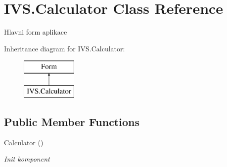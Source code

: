 \hypertarget{class_i_v_s_1_1_calculator}{}\section{I\+V\+S.\+Calculator Class Reference}
\label{class_i_v_s_1_1_calculator}


Hlavni form aplikace  


Inheritance diagram for I\+V\+S.\+Calculator\+:\begin{figure}[H]
\begin{center}
\leavevmode
\includegraphics[height=2.000000cm]{class_i_v_s_1_1_calculator}
\end{center}
\end{figure}
\subsection*{Public Member Functions}
\begin{DoxyCompactItemize}
\item 
\mbox{\hyperlink{class_i_v_s_1_1_calculator_a3d3f790c8ecb804fe212427b914dd82f}{Calculator}} ()
\begin{DoxyCompactList}\small\item\em Init komponent \end{DoxyCompactList}\end{DoxyCompactItemize}
